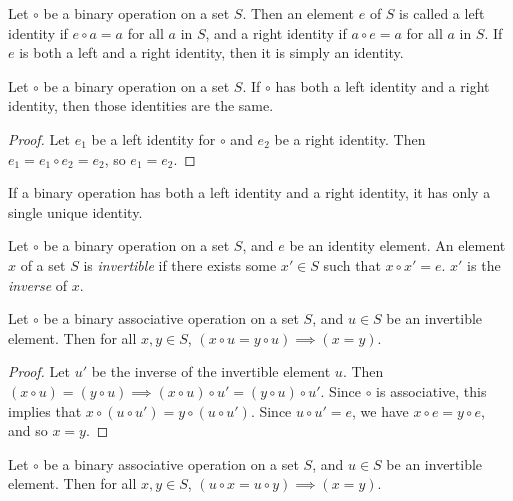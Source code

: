\begin{defn}\label{identity}
    Let $\circ$ be a binary operation on a set $S$. Then an element $e$ of $S$ is called a left identity if $e \circ a = a$ for all $a$ in $S$, and a right identity if $a \circ e = a$ for all $a$ in $S$. If $e$ is both a left and a right identity, then it is simply an identity.
\end{defn}

\begin{thm}
    Let $\circ$ be a binary operation on a set $S$. If $\circ$ has both a left identity and a right identity, then those identities are the same.
\end{thm}

\begin{proof}
    Let $e_1$ be a left identity for $\circ$ and $e_2$ be a right identity. Then $e_1 = e_1 \circ e_2 = e_2$, so $e_1 = e_2$.
\end{proof}

\begin{cor}
    If a binary operation has both a left identity and a right identity, it has only a single unique identity.
\end{cor}

\begin{defn}
    Let $\circ$ be a binary operation on a set $S$, and $e$ be an identity element. An element $x$ of a set $S$ is \emph{invertible} if there exists some $x' \in S$ such that $x \circ x' = e$. $x'$ is the \emph{inverse} of $x$.
\end{defn}

\begin{thm}
    Let $\circ$ be a binary associative operation on a set $S$, and $u \in S$ be an invertible element. Then for all $x, y \in S$, $(x \circ u = y \circ u) \implies (x = y)$.
\end{thm}

\begin{proof}
    Let $u'$ be the inverse of the invertible element $u$. Then $(x \circ u) = (y \circ u) \implies (x \circ u) \circ u' = (y \circ u) \circ u'$. Since $\circ$ is associative, this implies that $x \circ (u \circ u') = y \circ (u \circ u')$. Since $u \circ u' = e$, we have $x \circ e = y \circ e$, and so $x = y$.
\end{proof}

\begin{cor}
    Let $\circ$ be a binary associative operation on a set $S$, and $u \in S$ be an invertible element. Then for all $x, y \in S$, $(u \circ x = u \circ y) \implies (x = y)$.
\end{cor}

